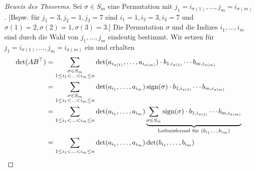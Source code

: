\begin{proof}[Beweis des Theorems]
	Sei $ \sigma \in S_m $ eine Permutation mit $ j_1 = i_{\sigma(1)}, \ldots, j_m = i_{\sigma(m)} $. [Bspw. für $ j_1 = 3, j_2 = 1, j_3 = 7 $ sind $ i_1 = 1, i_2 = 3, i_3 = 7 $ und $ \sigma(1) = 2, \sigma(2) = 1, \sigma(3) = 3 $.] Die Permutation $ \sigma $ und die Indizes $ i_1, \ldots, i_m $ sind durch die Wahl von $ j_1, \ldots, j_m $ eindeutig bestimmt. Wir setzen für $ j_1 = i_{\sigma(1)}, \ldots, j_m = i_{\sigma(m)} $ ein und erhalten
	\begin{align*}
		\det(AB^\top) &= \sum_{\substack{\sigma \in S_m \\ 1 \leq i_1 < \ldots < i_m \leq n}} \det(a_{i_{\sigma(1)}}, \ldots, a_{i_{\sigma(m)}}) \cdot b_{1,i_{\sigma(1)}} \cdots b_{m,i_{\sigma(m)}} \\
		&= \sum_{\substack{\sigma \in S_m \\ 1 \leq i_1 < \ldots < i_m \leq n}} \det(a_{i_1}, \ldots, a_{i_m}) \operatorname{sign}(\sigma) \cdot b_{1,i_{\sigma(1)}} \cdots b_{m,i_{\sigma(m)}} \\
		&= \sum_{1 \leq i_1 < \ldots < i_m \leq n} \det(a_{i_1}, \ldots, a_{i_m})
		\underbrace{\sum_{\sigma \in S_m} \operatorname{sign}(\sigma) \cdot b_{1,i_{\sigma(1)}} \cdots b_{m,i_{\sigma(m)}}
		}_{\text{Leibnizformel für } (b_{i_1}, \ldots, b_{i_m})} \\
		&= \sum_{1 \leq i_1 < \ldots < i_m \leq n} \det(a_{i_1}, \ldots, a_{i_m}) \det(b_{i_1}, \ldots, b_{i_m}) \qedhere
	\end{align*}
\end{proof}

